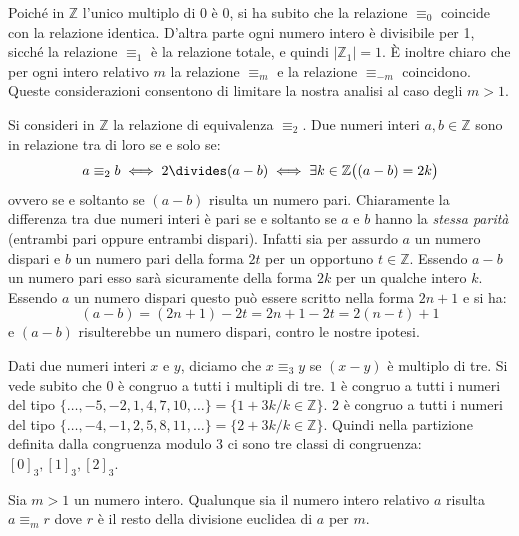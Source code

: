 \begin{osservation}
	Poiché in $\mathbb{Z}$ l'unico multiplo di 0 è 0, si ha subito che la relazione $\equiv_{0}$ coincide con la relazione identica. D'altra parte ogni numero intero è divisibile per 1, sicché la relazione $\equiv_{1}$ è la relazione totale, e quindi $|\mathbb{Z}_{1}|=1$. È inoltre chiaro che per ogni intero relativo $m$ la relazione $\equiv_{m}$ e la relazione $\equiv_{-m}$ coincidono. Queste considerazioni consentono di limitare la nostra analisi al caso degli $m>1$.
\end{osservation}

\begin{example}
	Si consideri in $\mathbb{Z}$ la relazione di equivalenza $\equiv_{2}$. Due numeri interi $a,b \in \mathbb{Z}$ sono in relazione tra di loro se e solo se:
	\begin{displaymath}
		a \equiv_{2} b \iff 2 \divides (a-b) \iff \exists k \in \mathbb{Z} \bigl((a-b)=2k\bigr)
	\end{displaymath}
	ovvero se e soltanto se $(a-b)$ risulta un numero pari. Chiaramente la differenza tra due numeri interi è pari se e soltanto se $a$ e $b$ hanno la \textit{stessa parità} (entrambi pari oppure entrambi dispari). Infatti sia per assurdo $a$ un numero dispari e $b$ un numero pari della forma $2t$ per un opportuno $t \in \mathbb{Z}$. Essendo $a-b$ un numero pari esso sarà sicuramente della forma $2k$ per un qualche intero $k$.  Essendo $a$ un numero dispari questo può essere scritto nella forma $2n+1$ e si ha:
	\begin{displaymath}
		(a-b) = (2n+1)- 2t = 2n+1-2t= 2(n-t) + 1
	\end{displaymath}
	e $(a-b)$ risulterebbe un numero dispari, contro le nostre ipotesi.
\end{example}


\begin{example}
	Dati due numeri interi $x$ e $y$, diciamo che $x \equiv_{3} y$ se $(x-y)$ è multiplo di tre. Si vede subito che $0$ è congruo a tutti i multipli di tre. $1$ è congruo a tutti i numeri del tipo $\{\ldots, -5, -2, 1,4,7,10,\ldots\} = \{1+3k / k\in \mathbb{Z}\}$. $2$ è congruo a tutti i numeri del tipo $\{\ldots,-4,-1,2,5,8,11,\ldots\}=\{2+3k/k \in \mathbb{Z}\}$. Quindi nella partizione definita dalla congruenza modulo 3 ci sono tre classi di congruenza: $[0]_{3}, [1]_{3},[2]_{3}$.
\end{example}

\begin{propbox}
	Sia $m>1$ un numero intero. Qualunque sia il numero intero relativo $a$ risulta $a \equiv_{m} r$ dove $r$ è il resto della divisione euclidea di $a$ per $m$.
\end{propbox}

